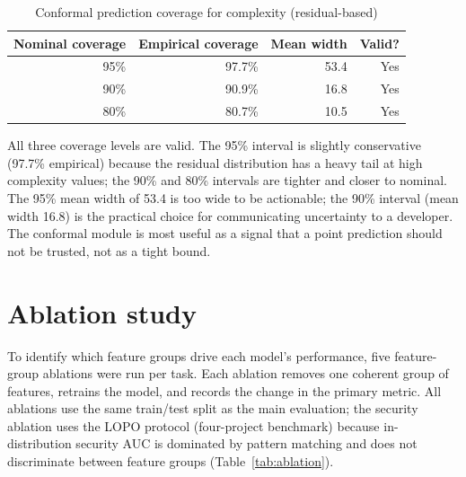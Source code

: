 \documentclass[12pt, oneside]{report}
\begin{document}
\begin{table}[H]
\centering
\caption{Conformal prediction coverage for complexity (residual-based)}
\label{tab:conformal}
\begin{tabular}{@{}rrrr@{}}
\toprule
\textbf{Nominal coverage} & \textbf{Empirical coverage} & \textbf{Mean width} & \textbf{Valid?} \\
\midrule
95\% & 97.7\% & 53.4 & Yes \\
90\% & 90.9\% & 16.8 & Yes \\
80\% & 80.7\% & 10.5 & Yes \\
\bottomrule
\end{tabular}
\end{table}

All three coverage levels are valid. The 95\% interval is slightly conservative (97.7\% empirical) because the residual distribution has a heavy tail at high complexity values; the 90\% and 80\% intervals are tighter and closer to nominal. The 95\% mean width of 53.4 is too wide to be actionable; the 90\% interval (mean width 16.8) is the practical choice for communicating uncertainty to a developer. The conformal module is most useful as a signal that a point prediction should not be trusted, not as a tight bound.

\section{Ablation study}
\label{sec:ablation}

To identify which feature groups drive each model's performance, five feature-group
ablations were run per task. Each ablation removes one coherent group of features,
retrains the model, and records the change in the primary metric. All ablations use
the same train/test split as the main evaluation; the security ablation uses the
LOPO protocol (four-project benchmark) because in-distribution security AUC is
dominated by pattern matching and does not discriminate between feature groups
(Table~\ref{tab:ablation}).
\end{document}
